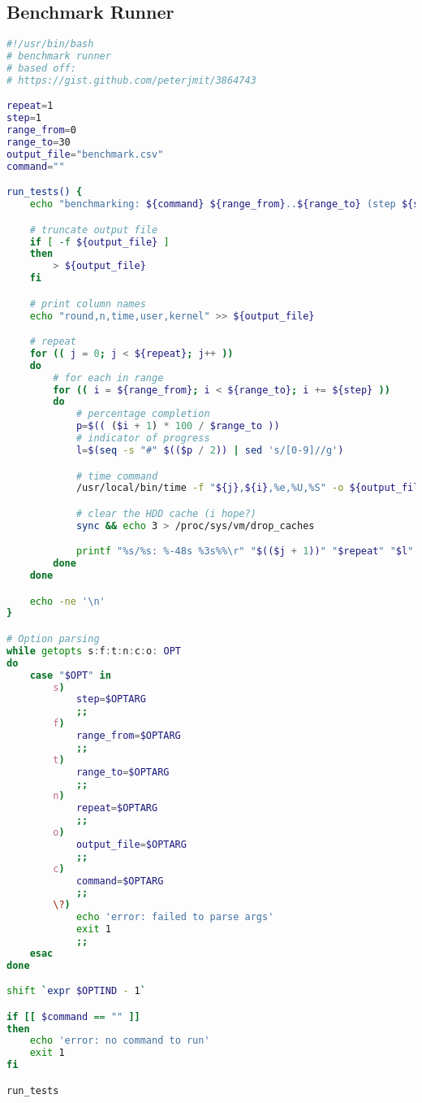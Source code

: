 \subsection{Benchmark Runner}
\label{appendix:benchmark}
\begin{lstlisting}[language=bash]
#!/usr/bin/bash
# benchmark runner
# based off:
# https://gist.github.com/peterjmit/3864743

repeat=1
step=1
range_from=0
range_to=30
output_file="benchmark.csv"
command=""

run_tests() {
    echo "benchmarking: ${command} ${range_from}..${range_to} (step ${step})"

    # truncate output file
    if [ -f ${output_file} ]
    then
        > ${output_file}
    fi

    # print column names
    echo "round,n,time,user,kernel" >> ${output_file}

    # repeat
    for (( j = 0; j < ${repeat}; j++ ))
    do
        # for each in range
        for (( i = ${range_from}; i < ${range_to}; i += ${step} ))
        do
            # percentage completion
            p=$(( ($i + 1) * 100 / $range_to ))
            # indicator of progress
            l=$(seq -s "#" $(($p / 2)) | sed 's/[0-9]//g')

            # time command
            /usr/local/bin/time -f "${j},${i},%e,%U,%S" -o ${output_file} -a ${command} ${i} > /dev/null

            # clear the HDD cache (i hope?)
            sync && echo 3 > /proc/sys/vm/drop_caches

            printf "%s/%s: %-48s %3s%%\r" "$(($j + 1))" "$repeat" "$l" "$p"
        done
    done

    echo -ne '\n'
}

# Option parsing
while getopts s:f:t:n:c:o: OPT
do
    case "$OPT" in
        s)
            step=$OPTARG
            ;;
        f)
            range_from=$OPTARG
            ;;
        t)
            range_to=$OPTARG
            ;;
        n)
            repeat=$OPTARG
            ;;
        o)
            output_file=$OPTARG
            ;;
        c)
            command=$OPTARG
            ;;
        \?)
            echo 'error: failed to parse args'
            exit 1
            ;;
    esac
done

shift `expr $OPTIND - 1`

if [[ $command == "" ]]
then
    echo 'error: no command to run'
    exit 1
fi

run_tests
\end{lstlisting}

